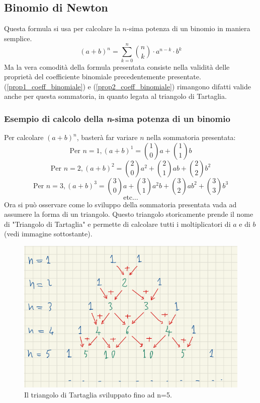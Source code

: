 \documentclass[12pt]{article}
\begin{document}
\subsection{Binomio di Newton}
Questa formula si usa per calcolare la $n$-sima potenza di un binomio in maniera semplice.
\begin{equation}
    (a+b)^n = \sum_{k=0}^{n} \binom{n}{k} \cdot a^{n-k} \cdot b^k \label{eq:binom_newton}
\end{equation}
Ma la vera comodità della formula presentata consiste nella validità delle proprietà del coefficiente binomiale precedentemente presentate.\\
(\ref{prop1_coeff_binomiale}) e (\ref{prop2_coeff_binomiale}) rimangono difatti valide anche per questa sommatoria, in quanto legata al triangolo di Tartaglia.\\
\subsubsection{Esempio di calcolo della \textit{n}-sima potenza di un binomio}
Per calcolare $(a+b)^n$, basterà far variare $n$ nella sommatoria presentata:
\[
    \text{Per } n=1, (a + b)^1 = \binom{1}{0}a + \binom{1}{1}b
\]
\[
    \text{Per } n=2, (a + b)^2 = \binom{2}{0}a^2 + \binom{2}{1}ab + \binom{2}{2}b^2
\]
\[
    \text{Per } n=3, (a + b)^3 = \binom{3}{0}a + \binom{3}{1}a^2b + \binom{3}{2}ab^2 + \binom{3}{3}b^3
\]
\[
    \text{etc} \dots
\]
Ora si può osservare come lo sviluppo della sommatoria presentata vada ad assumere la forma di un triangolo. Questo triangolo storicamente prende il nome di "Triangolo di Tartaglia" e permette di calcolare tutti i moltiplicatori di $a$ e di $b$ (vedi immagine sottostante).
\begin{figure}[!htb]
    \centering
    \includegraphics[width=1\textwidth, height=.7\textheight,keepaspectratio]{lezione_2/tartaglia.PNG} %
    \begin{center}
        \caption{\label{fig:tartaglia}Il triangolo di Tartaglia sviluppato fino ad n=5.} %
    \end{center}
\end{figure}
\end{document}
